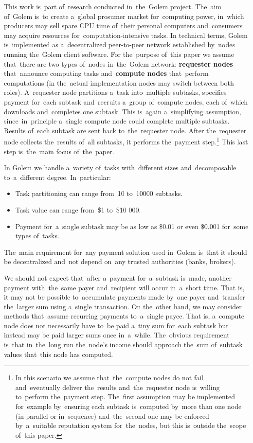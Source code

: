 \documentclass[a4paper]{article}
\begin{document}
    This work  is~part of~research conducted in~the~Golem project. The~aim of~Golem  is~to create a~global prosumer
    market for~computing power, in~which producers may sell spare CPU time of~their personal computers and~consumers
    may acquire resources for~computation-intensive tasks. In technical terms, Golem  is~implemented as a~decentralized
    peer-to-peer network established by~nodes running the~Golem client software. For the~purpose of~this paper
    we assume that~there are two types of~nodes in~the~Golem network: \textbf{requester nodes} that~announce computing
    tasks and~\textbf{compute nodes} that~perform computations (in the~actual implementation nodes may switch between
    both roles).
    A~requester node partitions a~task into~multiple subtasks, specifies payment for~each subtask and~recruits
    a~group of~compute nodes, each of~which downloads and~completes one subtask. This  is~again a~simplifying
    assumption, since~in~principle a~single compute node could complete multiple subtasks.
    Results of~each subtask are sent back to~the~requester node. After the~requester node collects the~results of~all
    subtasks, it performs the~payment step.\footnote{In this scenario we assume that~the~compute nodes do not fail
    and~eventually deliver the~results and~the~requester node  is~willing to~perform the~payment step.
    The~first assumption may be implemented for~example by~ensuring each subtask is~computed by~more than one node
    (in parallel or in~sequence) and~the~second one may be enforced by~a~suitable reputation system for~the~nodes,
    but this  is~outside the~scope of~this paper.} This last step  is~the~main focus of~the~paper.

    In Golem we handle a~variety of~tasks with~different sizes and~decomposable to~a~different degree. In~particular:
    \begin{itemize}
        \item Task partitioning can range from~10 to~10000 subtasks.
        \item Task value can range from~\$1 to~\$10 000.
        \item Payment for~a~single subtask may be as low as \$0.01 or even \$0.001 for~some types of~tasks.
    \end{itemize}

    The~main requirement for~any payment solution used in~Golem  is~that it should be decentralized and~not depend
    on~any trusted authorities (banks, brokers).


    We should not expect that~after a~payment for~a~subtask  is~made, another payment with~the~same payer and~recipient
    will occur in~a~short time. That is, it may not be possible to~accumulate payments made by~one payer and~transfer
    the~larger sum using a~single transaction. On the~other hand, we may consider methods that~assume recurring
    payments to~a~single payee. That is, a~compute node does not necessarily have to~be paid a~tiny sum for~each
    subtask but instead may be paid larger sums once in~a~while. The~obvious requirement  is~that in~the~long run
    the~node's income should approach the~sum of~subtask values that~this node has computed.
\end{document}
